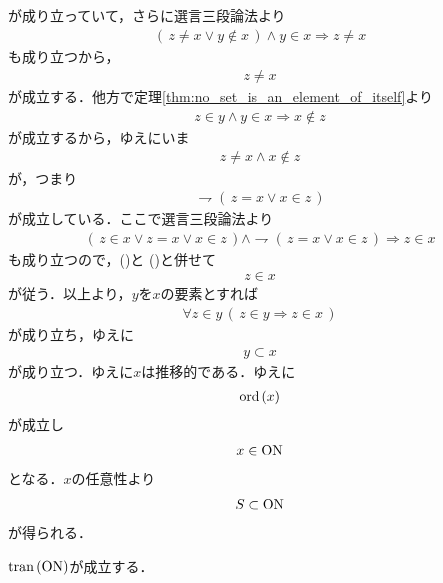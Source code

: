 \begin{sketch}
		が成り立っていて，さらに選言三段論法より
		\begin{align}
			(\, z \neq x \vee y \notin x\, ) \wedge y \in x \Longrightarrow z \neq x
		\end{align}
		も成り立つから，
		\begin{align}
			z \neq x
		\end{align}
		が成立する．他方で定理\ref{thm:no_set_is_an_element_of_itself}より
		\begin{align}
			z \in y \wedge y \in x \Longrightarrow x \notin z
		\end{align}
		が成立するから，ゆえにいま
		\begin{align}
			z \neq x \wedge x \notin z
		\end{align}
		が，つまり
		\begin{align}
			\rightharpoondown (\, z = x \vee x \in z\, )
			\label{fom:thm_transitive_totally_ordered_class_is_contained_in_ON_4}
		\end{align}
		が成立している．ここで選言三段論法より
		\begin{align}
			(\, z \in x \vee z = x \vee x \in z\, ) \wedge 
			\rightharpoondown (\, z = x \vee x \in z\, )
			\Longrightarrow z \in x
		\end{align}
		も成り立つので，()と
		()と併せて
		\begin{align}
			z \in x
		\end{align}
		が従う．以上より，$y$を$x$の要素とすれば
		\begin{align}
			\forall z \in y\, (\, z \in y \Longrightarrow z \in x\, )
		\end{align}
		が成り立ち，ゆえに
		\begin{align}
			y \subset x
		\end{align}
		が成り立つ．ゆえに$x$は推移的である．ゆえに
		\begin{align}
			\operatorname*{ord}\hspace{0.15em}(x)
		\end{align}
		が成立し
		\begin{align}
			x \in \mathrm{ON}
		\end{align}
		となる．$x$の任意性より
		\begin{align}
			S \subset \mathrm{ON}
		\end{align}
		が得られる．
		\QED
	\end{sketch}
	
	\begin{screen}
		\begin{thm}[$\ON$は推移的]\label{thm:On_is_transitive}
			$\operatorname*{tran}\hspace{0.15em}(\mathrm{ON})$が成立する．
		\end{thm}
	\end{screen}
	
